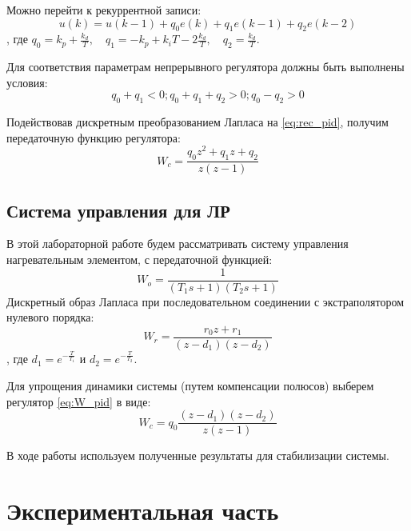 \documentclass[a4paper, 14pt]{extarticle}
\theoremstyle{definition}
\theoremstyle{plain}
\theoremstyle{remark}
\begin{document}
Можно перейти к рекуррентной записи:
\begin{equation} \label{eq:rec_pid}
	u(k) = u(k - 1) + q_0 e(k) + q_1 e(k - 1) + q_2 e(k - 2)
\end{equation}
, где $q_0 = k_p + \frac{k_d}{T}, \quad q_1 = -k_p + k_i T - 2\frac{k_d}{T}, \quad q_2 = \frac{k_d}{T}.$

Для соответствия параметрам непрерывного регулятора должны быть выполнены условия:
\begin{equation}
	q_0 + q_1 < 0; q_0 + q_1 + q_2 > 0; q_0 - q_2 > 0
\end{equation}

Подействовав дискретным преобразованием Лапласа на \ref{eq:rec_pid}, получим передаточную функцию регулятора:
\begin{equation}\label{eq:W_pid}
	W_c = \frac{q_0z^2 +q_1z + q_2}{z(z-1)}
\end{equation}

\subsection{Система управления для ЛР}
В этой лабораторной работе будем рассматривать систему управления нагревательным элементом, с передаточной функцией:
\begin{equation}
	W_o = \frac{1}{(T_1s+1)(T_2s+1)}
\end{equation}
Дискретный образ Лапласа при последовательном соединении с экстраполятором нулевого порядка:
\begin{equation}
	W_r = \frac{r_0z + r_1}{(z-d_1)(z-d_2)}
\end{equation}
, где $d_1=e^{-\frac{T}{T_1}}$ и $d_2=e^{-\frac{T}{T_2}}$.

Для упрощения динамики системы (путем компенсации полюсов) выберем регулятор \ref{eq:W_pid} в виде:
\begin{equation}
	W_c = q_0\frac{(z-d_1)(z-d_2)}{z(z-1)}
\end{equation}

В ходе работы используем полученные результаты для стабилизации системы.

\pagebreak
\section{Экспериментальная часть}
\end{document}
